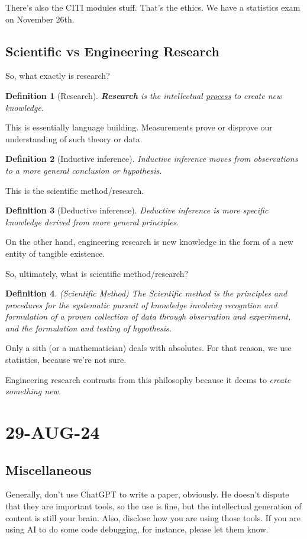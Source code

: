 \documentclass[10pt, oneside]{article}
\newtheorem{defn}{Definition}
\begin{document}
There's also the CITI modules stuff. That's the ethics. We have a statistics exam on November 26th. 

\subsection{Scientific vs Engineering Research}
So, what exactly is research?

    
\begin{defn}[Research]
    \textbf{Research} is the intellectual \underline{process} to create new knowledge. 
\end{defn}
This is essentially language building. Measurements prove or disprove our understanding of such theory or data. 
\begin{defn}[Inductive inference]
Inductive inference moves from observations to a more general conclusion or hypothesis.
\end{defn}
This is the scientific method/research.
\begin{defn}[Deductive inference]
    Deductive inference is more specific knowledge derived from more general principles.
\end{defn}
On the other hand, engineering research is new knowledge in the form of a new entity of tangible existence. 

So, ultimately, what is scientific method/research?
\begin{defn}(Scientific Method)
    The Scientific method is the principles and procedures for the systematic pursuit of knowledge involving recogntion and formulation of a proven collection of data through observation and experiment, and the formulation and testing of hypothesis. 
\end{defn}
Only a sith (or a mathematician) deals with absolutes. For that reason, we use statistics, because we're not sure. 

Engineering research contrasts from this philosophy because it deems to \textit{create something new.}

\section{29-AUG-24}
\subsection{Miscellaneous}
Generally, don't use ChatGPT to write a paper, obviously. He doesn't dispute that they are important tools, so the use is fine, but the intellectual generation of content is still your brain. Also, disclose how you are using those tools. If you are using AI to do some code debugging, for instance, please let them know. 
\end{document}
